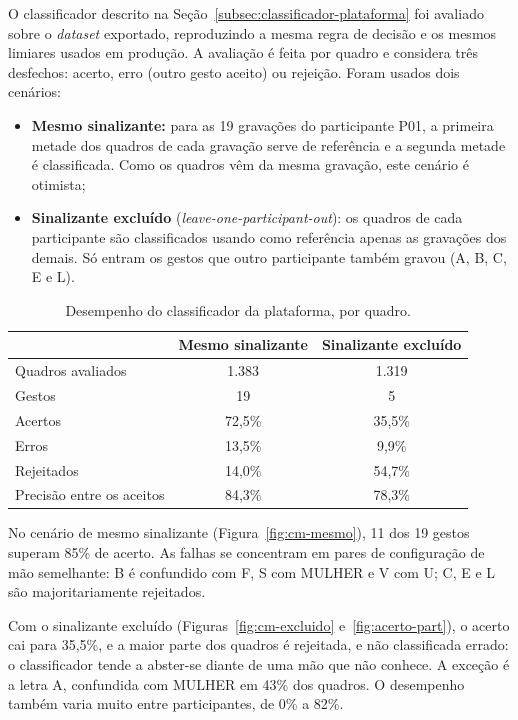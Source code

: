 O classificador descrito na Seção~\ref{subsec:classificador-plataforma} foi
avaliado sobre o \textit{dataset} exportado, reproduzindo a mesma regra de decisão
e os mesmos limiares usados em produção. A avaliação é feita por quadro e
considera três desfechos: acerto, erro (outro gesto aceito) ou rejeição. Foram
usados dois cenários:

\begin{itemize}[leftmargin=2cm]
  \item \textbf{Mesmo sinalizante:} para as 19 gravações do participante P01, a
  primeira metade dos quadros de cada gravação serve de referência e a segunda
  metade é classificada. Como os quadros vêm da mesma gravação, este cenário é
  otimista;
  \item \textbf{Sinalizante excluído} (\textit{leave-one-participant-out}): os
  quadros de cada participante são classificados usando como referência apenas as
  gravações dos demais. Só entram os gestos que outro participante também gravou
  (A, B, C, E e L).
\end{itemize}

\begin{table}[htbp]
\centering
\caption{Desempenho do classificador da plataforma, por quadro.}
\label{tab:desempenho-plataforma}
\begin{tabular}{@{}l c c@{}}
\toprule
 & \textbf{Mesmo sinalizante} & \textbf{Sinalizante excluído} \\
\midrule
Quadros avaliados & 1.383 & 1.319 \\
Gestos & 19 & 5 \\
Acertos & 72,5\% & 35,5\% \\
Erros & 13,5\% & 9,9\% \\
Rejeitados & 14,0\% & 54,7\% \\
Precisão entre os aceitos & 84,3\% & 78,3\% \\
\bottomrule
\end{tabular}
\end{table}

No cenário de mesmo sinalizante (Figura~\ref{fig:cm-mesmo}), 11 dos 19 gestos
superam 85\% de acerto. As falhas se concentram em pares de configuração de mão
semelhante: B é confundido com F, S com MULHER e V com U; C, E e L são
majoritariamente rejeitados.

Com o sinalizante excluído (Figuras~\ref{fig:cm-excluido} e~\ref{fig:acerto-part}),
o acerto cai para 35,5\%, e a maior parte dos quadros é rejeitada, e não
classificada errado: o classificador tende a abster-se diante de uma mão que não
conhece. A exceção é a letra A, confundida com MULHER em 43\% dos quadros. O
desempenho também varia muito entre participantes, de 0\% a 82\%.

